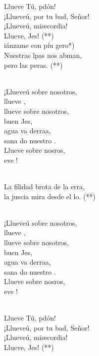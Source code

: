 \documentclass[12pt]{article}
\begin{document}
\begin{multicols*}{2}
\begin{cancion}%
	Llueve Tú, pdón!\\
	¡Llueveú, por tu bad, Señor!\\
	¡Llueveú, misecordia!\\
	Llueve, Jes! (**)  \\
	iánzame con píu gero*) \\
	Nuestras lpas nos abman,\\
	pero  las peras. (**) \\\jump\\
	\begin{chorus}%
	¡Llueveú sobre nosotros,\\
	llueve , \\
	llueve  sobre nosotros, \\
	buen Jes,\\
	agua va derraa,\\
	sana do nuestro .\\
	Llueve  sobre nosros, \\
	eve ! \\
	\end{chorus}%
	\jump\\
	La filidad brota de la erra,\\
	la juscia mira desde el lo. (**)\\\jump\\
	\begin{chorus}%
	¡Llueveú sobre nosotros,\\
	llueve , \\
	llueve  sobre nosotros, \\
	buen Jes,\\
	agua va derraa,\\
	sana do nuestro .\\
	Llueve  sobre nosros, \\
	eve ! \\
	\end{chorus}%
	\jump\\
	Llueve Tú, pdón!\\
	¡Llueveú, por tu bad, Señor!\\
	¡Llueveú, misecordia!\\
	Llueve, Jes! (**)  \\
\end{cancion}%


\end{multicols*}
\end{document}
